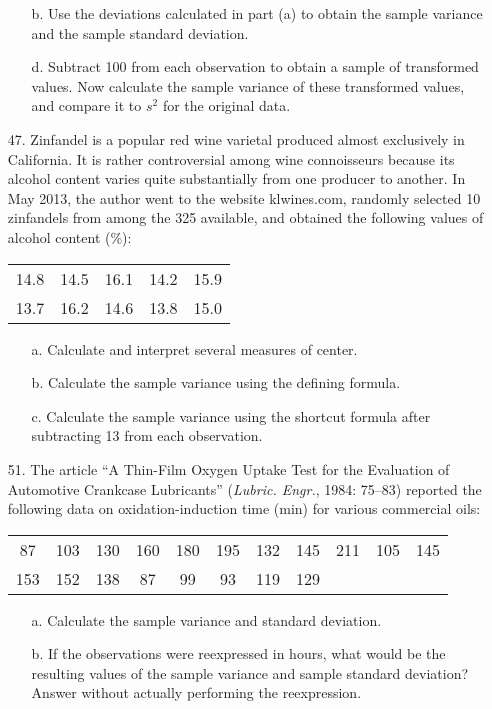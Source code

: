 \documentclass[letterpaper,12pt]{article}
\begin{document}
\begin{enumerate}
\begin{enumerate}
      \item[b.]
        Use the deviations calculated in part (a) to obtain the sample variance and the sample standard deviation.
      \item[d.]
        Subtract 100 from each observation to obtain a sample of transformed values. Now calculate the sample variance of these transformed values, and compare it to $s^2$ for the original data.
    \end{enumerate}
  \item[47.]
    Zinfandel is a popular red wine varietal produced almost exclusively in California. It is rather controversial among wine connoisseurs because its alcohol content varies quite substantially from one producer to another. In May 2013, the author went to the website klwines.com, randomly selected 10 zinfandels from among the 325 available, and obtained the following values of alcohol content (\%):
    \begin{center}
      \begin{tabular}{*{5}{c}}
        14.8 & 14.5 & 16.1 & 14.2 & 15.9 \\
        13.7 & 16.2 & 14.6 & 13.8 & 15.0
      \end{tabular}
    \end{center}
    \begin{enumerate}
      \item[a.]
        Calculate and interpret several measures of center.
      \item[b.]
        Calculate the sample variance using the defining formula.
      \item[c.]
        Calculate the sample variance using the shortcut formula after subtracting 13 from each observation.
    \end{enumerate}
  \item[51.]
    The article ``A Thin-Film Oxygen Uptake Test for the Evaluation of Automotive Crankcase Lubricants'' (\textit{Lubric. Engr.}, 1984: 75–83) reported the following data on oxidation-induction time (min) for various commercial oils:
    \begin{center}
      \begin{tabular}{*{11}{S[table-format=3.0]}}
        87 & 103 & 130 & 160 & 180 & 195 & 132 & 145 & 211 & 105 & 145 \\
        153 & 152 & 138 & 87 & 99 & 93 & 119 & 129
      \end{tabular}
    \end{center}
    \begin{enumerate}
      \item[a.]
        Calculate the sample variance and standard deviation.
      \item[b.]
        If the observations were reexpressed in hours, what would be the resulting values of the sample variance and sample standard deviation? Answer without actually performing the reexpression.
    \end{enumerate}
\end{enumerate}
\end{document}
